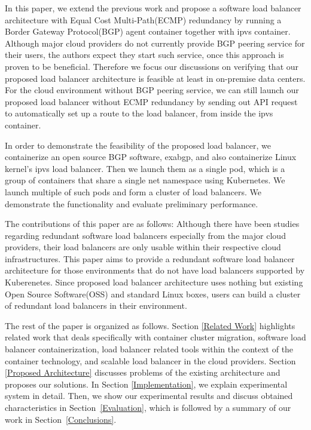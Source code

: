 In this paper, we extend the previous work and propose a software load balancer architecture with Equal Cost Multi-Path(ECMP)\cite{thaler2000multipath} redundancy by running a Border Gateway Protocol(BGP) agent container together with ipvs container.
Although major cloud providers do not currently provide BGP peering service for their users, the authors expect they start such service, once this approach is proven to be beneficial.
Therefore we focus our discussions on verifying that our proposed load balancer architecture is feasible at least in on-premise data centers.
For the cloud environment without BGP peering service, we can still launch our proposed load balancer without ECMP redundancy by sending out API request to automatically set up a route to the load balancer, from inside the ipvs container.

In order to demonstrate the feasibility of the proposed load balancer, we containerize an open source BGP software, exabgp\cite{exa-networks_2018}, and also containerize Linux kernel's ipvs load balancer. Then we launch them as a single pod, which is a group of containers that share a single net namespace using Kubernetes. We launch multiple of such pods and form a cluster of load balancers.
We demonstrate the functionality and evaluate preliminary performance.

The contributions of this paper are as follows:
Although there have been studies regarding redundant software load balancers especially from the major cloud providers\cite{eisenbud2016maglev,patel2013ananta}, their load balancers are only usable within their respective cloud infrastructures.
This paper aims to provide a redundant software load balancer architecture for those environments that do not have load balancers supported by Kuberenetes.
Since proposed load balancer architecture uses nothing but existing Open Source Software(OSS) and standard Linux boxes, users can build a cluster of redundant load balancers in their environment.

The rest of the paper is organized as follows.
Section \ref{Related Work} highlights related work that deals specifically with container cluster migration,
software load balancer containerization, load balancer related tools within the context of the container technology, and scalable load balancer in the cloud providers.
Section \ref{Proposed Architecture} discusses problems of the existing architecture and proposes our solutions.
In Section \ref{Implementation}, we explain experimental system in detail.
Then, we show our experimental results and discuss obtained characteristics in Section~\ref{Evaluation}, which is followed by a summary of our work in Section~\ref{Conclusions}.

